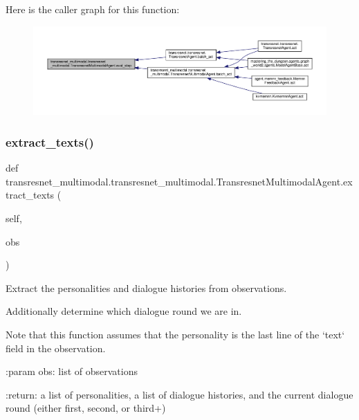 Here is the caller graph for this function\+:
\nopagebreak
\begin{figure}[H]
\begin{center}
\leavevmode
\includegraphics[width=350pt]{classtransresnet__multimodal_1_1transresnet__multimodal_1_1TransresnetMultimodalAgent_ac38417de9a1c4f653bffeb852dac0a7d_icgraph}
\end{center}
\end{figure}
\mbox{\label{classtransresnet__multimodal_1_1transresnet__multimodal_1_1TransresnetMultimodalAgent_ac1e4bd7463865562a56b8d204127f26e}} 
\subsubsection{\texorpdfstring{extract\+\_\+texts()}{extract\_texts()}}
{\footnotesize\ttfamily def transresnet\+\_\+multimodal.\+transresnet\+\_\+multimodal.\+Transresnet\+Multimodal\+Agent.\+extract\+\_\+texts (\begin{DoxyParamCaption}\item[{}]{self,  }\item[{}]{obs }\end{DoxyParamCaption})}

\begin{DoxyVerb}Extract the personalities and dialogue histories from observations.

Additionally determine which dialogue round we are in.

Note that this function assumes that the personality is the
last line of the `text` field in the observation.

:param obs:
    list of observations

:return:
    a list of personalities, a list of dialogue histories, and the
    current dialogue round (either first, second, or third+)
\end{DoxyVerb}
 

